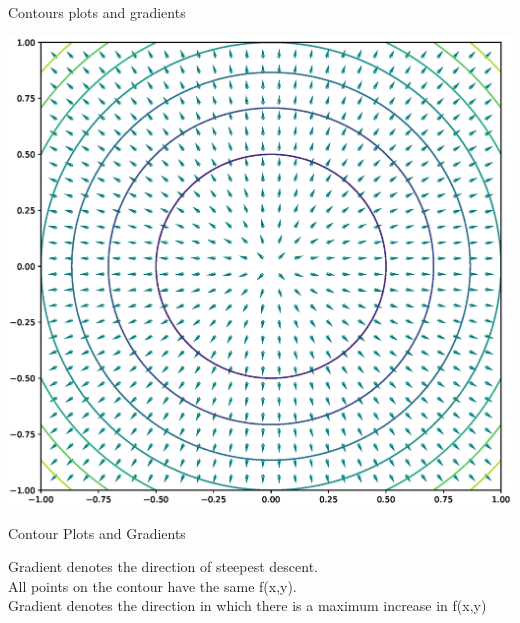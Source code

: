 \documentclass{beamer}
\begin{document}
\begin{frame}{Contours plots and gradients}
    
     \begin{center}
     \includegraphics[totalheight=6cm]{ml-maths/gradient-field.eps}
 \end{center}
    
    
\end{frame}







\begin{frame}{Contour Plots and Gradients}
    
    Gradient denotes the direction of steepest descent.\\
    All points on the contour have the same f(x,y).\\
    Gradient denotes the direction in which there is a maximum increase in f(x,y)\\

    
    
\end{frame}



    
    
    
\end{document}
